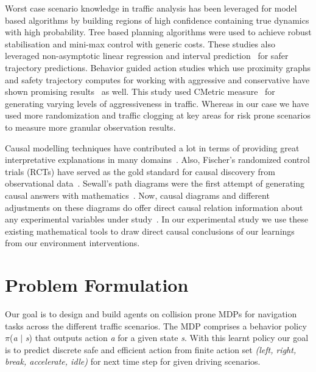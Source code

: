 \documentclass[a4, conference]{IEEEtran}
\begin{document}
    Worst case scenario knowledge in traffic analysis has been leveraged for model based algorithms by building regions of high confidence containing true dynamics with high probability. Tree based planning algorithms were used to achieve robust stabilisation and mini-max control with generic costs. These studies also leveraged non-asymptotic linear regression and interval prediction~\cite{leurent2020safe, leurent2019approximate} for safer trajectory predictions. Behavior guided action studies which use proximity graphs and safety trajectory computes for working with aggressive and conservative have shown promising results~\cite{mavrogiannis2020b} as well. This study used CMetric measure~\cite{chandra2020cmetric} for generating varying levels of aggressiveness in traffic. Whereas in our case we have used more randomization and traffic clogging at key areas for risk prone scenarios to measure more granular observation results.

    Causal modelling techniques have contributed a lot in terms of providing great interpretative explanations in many domains~\cite{hicks1980causality, smirnov2009granger, granger1988some, pearl2018does}. Also, Fischer's randomized control trials (RCTs) have served as the gold standard for causal discovery from observational data~\cite{pearl2018book}. Sewall's path diagrams were the first attempt of generating causal answers with mathematics~\cite{wright1934method}. Now, causal diagrams and different adjustments on these diagrams do offer direct causal relation information about any experimental variables under study~\cite{pearl2009causal, pearl2018book, richardson2013single, bareinboim2020pearl}. In our experimental study we use these existing mathematical tools to draw direct causal conclusions of our learnings from our environment interventions.

\section{Problem Formulation}


    Our goal is to design and build agents on collision prone MDPs for navigation tasks across the different traffic scenarios. The MDP comprises a behavior policy $\pi$(\textit{a} $\mid$ \textit{s}) that outputs action \textit{a} for a given state \textit{s}. With this learnt policy our goal is to predict discrete safe and efficient action from finite action set \textit{(left, right, break, accelerate, idle)} for next time step for given driving scenarios.
\end{document}
